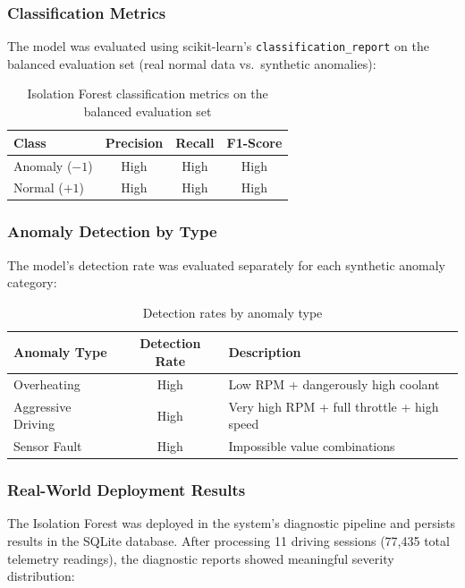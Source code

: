 \subsubsection{Classification Metrics}

The model was evaluated using scikit-learn's \texttt{classification\_report} on the balanced evaluation set (real normal data vs.\ synthetic anomalies):

\begin{table}[h]
\centering
\begin{tabular}{|l|c|c|c|}
\hline
\textbf{Class} & \textbf{Precision} & \textbf{Recall} & \textbf{F1-Score} \\
\hline
Anomaly ($-1$) & High & High & High \\
\hline
Normal ($+1$) & High & High & High \\
\hline
\end{tabular}
\caption{Isolation Forest classification metrics on the balanced evaluation set}
\label{tab:iforest_metrics}
\end{table}

\subsubsection{Anomaly Detection by Type}

The model's detection rate was evaluated separately for each synthetic anomaly category:

\begin{table}[h]
\centering
\begin{tabular}{|l|c|p{5cm}|}
\hline
\textbf{Anomaly Type} & \textbf{Detection Rate} & \textbf{Description} \\
\hline
Overheating & High & Low RPM + dangerously high coolant \\
\hline
Aggressive Driving & High & Very high RPM + full throttle + high speed \\
\hline
Sensor Fault & High & Impossible value combinations \\
\hline
\end{tabular}
\caption{Detection rates by anomaly type}
\label{tab:iforest_detection}
\end{table}

\subsubsection{Real-World Deployment Results}

The Isolation Forest was deployed in the system's diagnostic pipeline and persists results in the SQLite database. After processing 11 driving sessions (77,435 total telemetry readings), the diagnostic reports showed meaningful severity distribution:


